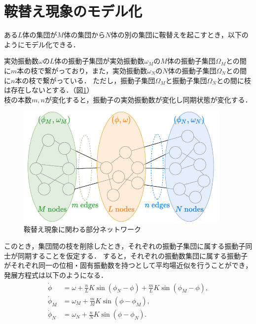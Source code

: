 \documentclass[../main]{subfiles}
\begin{document}
\section{鞍替え現象のモデル化}
ある$L$体の集団が$M$体の集団から$N$体の別の集団に鞍替えを起こすとき，以下のようにモデル化できる．
\begin{screen}
実効振動数$\omega$の$L$体の振動子集団が実効振動数$\omega_M$の$M$体の振動子集団$\Omega_M$との間に$m$本の枝で繋がっており，また，実効振動数$\omega_N$の$N$体の振動子集団$\Omega_N$との間に$n$本の枝で繋がっている．
ただし，振動子集団$\Omega_M$と振動子集団$\Omega_N$との間に枝は存在しないとする．（図\ref{fig:switch}）\\
枝の本数$m,n$が変化すると，振動子の実効振動数が変化し同期状態が変化する．
\end{screen}
\begin{figure}[tbp]
\centering
\includegraphics[width=105mm]{./images/three_obj_before.pdf}
\centering
\caption{鞍替え現象に関わる部分ネットワーク}
\label{fig:switch}
\end{figure}
このとき，集団間の枝を削除したとき，それぞれの振動子集団に属する振動子同士が同期することを仮定する．
すると，それぞれの振動数集団に属する振動子がそれぞれ同一の位相・固有振動数を持つとして平均場近似を行うことができ，発展方程式は以下のようになる．
\begin{align}
    \label{eq:3body-default}
    \begin{split}
        \dot{\phi}&=\omega+\frac{n}{L}K\sin\left( \phi_N-\phi \right)+\frac{m}{L}K\sin\left( \phi_M-\phi \right),\\
        \dot{\phi}_M&=\omega_M+\frac{m}{M}K\sin\left( \phi-\phi_M \right), \\
        \dot{\phi}_N&=\omega_N+\frac{n}{N}K\sin\left( \phi-\phi_N \right).    
    \end{split}
\end{align}
\end{document}

